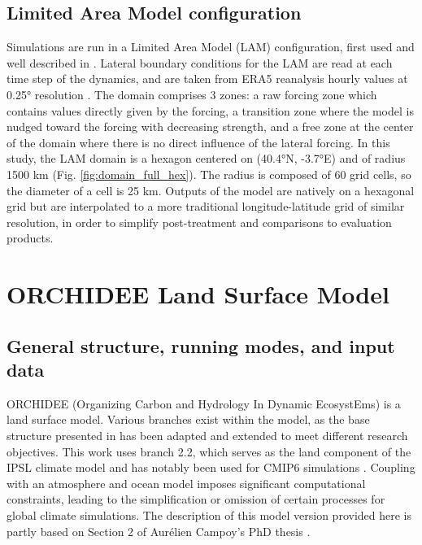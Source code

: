 \subsection{Limited Area Model configuration}
Simulations are run in a Limited Area Model (LAM) configuration, first used and well described in \citet{raillard_leveraging_2024}.
Lateral boundary conditions for the LAM are read at each time step of the dynamics, and are taken from ERA5 reanalysis hourly values at 0.25° resolution \citep{hersbach_era5_2020}.
The domain comprises 3 zones: a raw forcing zone which contains values directly given by the forcing, a transition zone  where the model is nudged toward the forcing with decreasing strength, and a free zone at the center of the domain where there is no direct influence of the lateral forcing.
In this study, the LAM domain is a hexagon centered on (40.4°N, -3.7°E) and of radius 1500 km (Fig. \ref{fig:domain_full_hex}). The radius is composed of 60 grid cells, so the diameter of a cell is 25 km. 
Outputs of the model are natively on a hexagonal grid but are interpolated to a more traditional longitude-latitude grid of similar resolution, in order to simplify post-treatment and comparisons to evaluation products.

\section{ORCHIDEE Land Surface Model}
\subsection{General structure, running modes, and input data}
ORCHIDEE (Organizing Carbon and Hydrology In Dynamic EcosystEms) is a land surface model. Various branches exist within the model, as the base structure presented in \citet{krinner_dynamic_2005} has been adapted and extended to meet different research objectives.
This work uses branch 2.2, which serves as the land component of the IPSL climate model and has notably been used for CMIP6 simulations \citep{boucher_presentation_2020}. Coupling with an atmosphere and ocean model imposes significant computational constraints, leading to the simplification or omission of certain processes for global climate simulations.
The description of this model version provided here is partly based on Section 2 of Aurélien Campoy’s PhD thesis \citep{campoy_influence_2013}.

